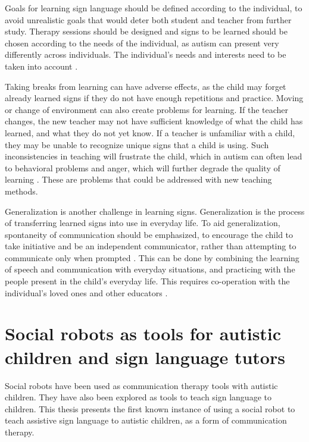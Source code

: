 Goals for learning sign language should be defined according to the individual, to avoid unrealistic goals that would deter both student and teacher from further study. Therapy sessions should be designed and signs to be learned should be chosen according to the needs of the individual, as autism can present very differently across individuals. The individual's needs and interests need to be taken into account \cite{bonvillian1981sign, tetzchner}.

Taking breaks from learning can have adverse effects, as the child may forget already learned signs if they do not have enough repetitions and practice. Moving or change of environment can also create problems for learning. If the teacher changes, the new teacher may not have sufficient knowledge of what the child has learned, and what they do not yet know. If a teacher is unfamiliar with a child, they may be unable to recognize unique signs that a child is using. Such inconsistencies in teaching will frustrate the child, which in autism can often lead to behavioral problems and anger, which will further degrade the quality of learning \cite{tetzchner}. These are problems that could be addressed with new teaching methods.

Generalization is another challenge in learning signs. Generalization is the process of transferring learned signs into use in everyday life. To aid generalization, spontaneity of communication should be emphasized, to encourage the child to take initiative and be an independent communicator, rather than attempting to communicate only when prompted \cite{carr1983acquisition}. This can be done by combining the learning of speech and communication with everyday situations, and practicing with the people present in the child's everyday life. This requires co-operation with the individual's loved ones and other educators \cite{carr1983acquisition, tetzchner}.



\section{Social robots as tools for autistic children and sign language tutors}

Social robots have been used as communication therapy tools with autistic children. They have also been explored as tools to teach sign language to children. This thesis presents the first known instance of using a social robot to teach assistive sign language to autistic children, as a form of communication therapy. 


